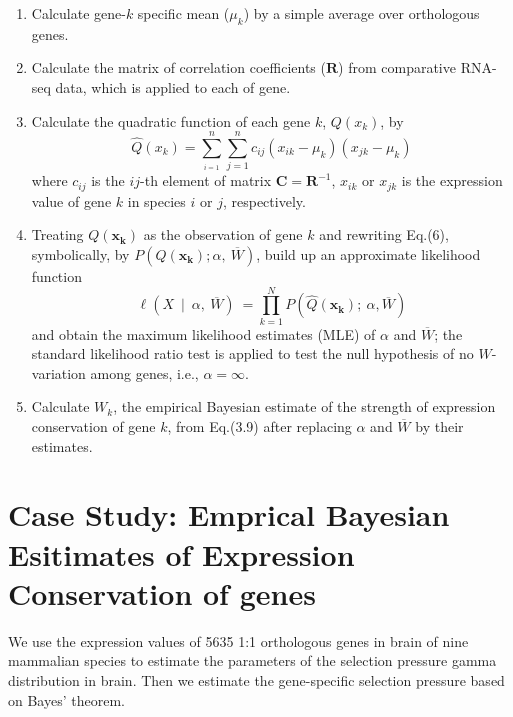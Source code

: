 \documentclass[]{book}
\providecommand{\tightlist}{%
  \setlength{\itemsep}{0pt}\setlength{\parskip}{0pt}}
\begin{document}
\begin{enumerate}
\def\labelenumi{\arabic{enumi}.}
\tightlist
\item
  Calculate gene-\(k\) specific mean (\(\mu_{k}\)) by a simple average over orthologous genes.
\item
  Calculate the matrix of correlation coefficients (\(\boldsymbol{R}\)) from comparative RNA-seq data, which is applied to each of gene.
\item
  Calculate the quadratic function of each gene \(k\), \(Q\left(x_k\right)\), by
  \[\hat{Q}\left(x_k\right)=\sum_{_{i=1}}^n\sum_{j=1}^nc_{ij}\left(x_{ik}-\mu_k\right)\left(x_{jk}-\mu_k\right)\tag{3.12}\]
  where \(c_{ij}\) is the \(ij\)-th element of matrix \(\boldsymbol{C}=\boldsymbol{R}^{-1}\), \(x_{ik}\) or \(x_{jk}\) is the expression value of gene \(k\) in species \(i\) or \(j\), respectively.
\item
  Treating \(Q\left(\boldsymbol{x_k}\right)\) as the observation of gene \(k\) and rewriting Eq.(6), symbolically, by \(P\left(Q\left(\boldsymbol{x_k}\right);\alpha,\  \overline{W}\right)\), build up an approximate likelihood function
  \[\ell\left(X \  \mid \  \alpha,\  \overline{W}\right)\  =  \prod_{k=1}^NP\left(\hat{Q}\left(\boldsymbol{x_k}\right);\  \alpha,\overline{W}\right)\]
  and obtain the maximum likelihood estimates (MLE) of \(\alpha\) and \(\overline{W}\); the standard likelihood ratio test is applied to test the null hypothesis of no \(W\)-variation among genes, i.e., \(\alpha = \infty\).
\item
  Calculate \(W_{k}\), the empirical Bayesian estimate of the strength of expression conservation of gene \(k\), from Eq.(3.9) after replacing \(\alpha\) and \(\overline{W}\) by their estimates.
\end{enumerate}

\newpage

\hypertarget{case-study-emprical-bayesian-esitimates-of-expression-conservation-of-genes}{%
\section{Case Study: Emprical Bayesian Esitimates of Expression Conservation of genes}\label{case-study-emprical-bayesian-esitimates-of-expression-conservation-of-genes}}

We use the expression values of 5635 1:1 orthologous genes in brain of nine mammalian species to estimate the parameters of the selection pressure gamma distribution in brain. Then we estimate the gene-specific selection pressure based on Bayes' theorem.
\end{document}
